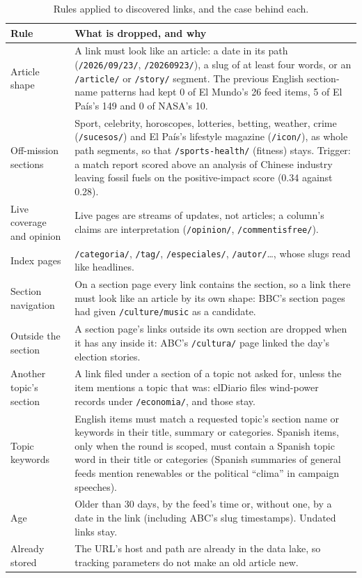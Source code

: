 \begin{table}[ht]
\centering
\small
\caption{Rules applied to discovered links, and the case behind each.}
\label{tab:discovery-filters}
\begin{tabularx}{\linewidth}{@{}p{3.3cm}X@{}}
\toprule
Rule & What is dropped, and why \\
\midrule
Article shape
& A link must look like an article: a date in its path
  (\texttt{/2026/09/23/}, \texttt{/20260923/}), a slug of at least four
  words, or an \texttt{/article/} or \texttt{/story/} segment. The
  previous English section-name patterns had kept 0 of El Mundo's 26
  feed items, 5 of El País's 149 and 0 of NASA's 10. \\
Off-mission sections
& Sport, celebrity, horoscopes, lotteries, betting, weather, crime
  (\texttt{/sucesos/}) and El País's lifestyle magazine
  (\texttt{/icon/}), as whole path segments, so that
  \texttt{/sports-health/} (fitness) stays. Trigger: a match report
  scored above an analysis of Chinese industry leaving fossil fuels on
  the positive-impact score (0.34 against 0.28). \\
Live coverage and opinion
& Live pages are streams of updates, not articles; a column's claims
  are interpretation (\texttt{/opinion/}, \texttt{/commentisfree/}). \\
Index pages
& \texttt{/categoria/}, \texttt{/tag/}, \texttt{/especiales/},
  \texttt{/autor/}\ldots, whose slugs read like headlines. \\
Section navigation
& On a section page every link contains the section, so a link there
  must look like an article by its own shape: BBC's section pages had
  given \texttt{/culture/music} as a candidate. \\
Outside the section
& A section page's links outside its own section are dropped when it
  has any inside it: ABC's \texttt{/cultura/} page linked the day's
  election stories. \\
Another topic's section
& A link filed under a section of a topic not asked for, unless the
  item mentions a topic that was: elDiario files wind-power records
  under \texttt{/economia/}, and those stay. \\
Topic keywords
& English items must match a requested topic's section name or
  keywords in their title, summary or categories. Spanish items, only
  when the round is scoped, must contain a Spanish topic word in their
  title or categories (Spanish summaries of general feeds mention
  renewables or the political ``clima'' in campaign speeches). \\
Age
& Older than 30 days, by the feed's time or, without one, by a date in
  the link (including ABC's slug timestamps). Undated links stay. \\
Already stored
& The URL's host and path are already in the data lake, so tracking
  parameters do not make an old article new. \\
\bottomrule
\end{tabularx}
\end{table}


